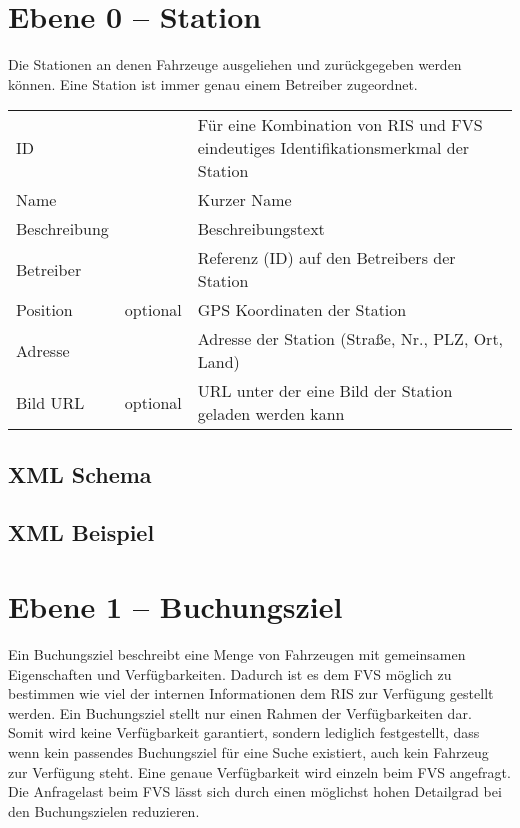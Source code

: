 \section{Ebene 0 -- Station}
Die Stationen an denen Fahrzeuge ausgeliehen und zurückgegeben werden können. Eine Station ist immer genau einem Betreiber zugeordnet.

\begin{flushleft}
\begin{tabularx}{\linewidth}{l>{\raggedright\arraybackslash}l>{\raggedright\arraybackslash}X} 
\toprule
ID & & Für eine Kombination von RIS und FVS eindeutiges Identifikationsmerkmal der Station \\
Name & & Kurzer Name \\
Beschreibung & & Beschreibungstext \\
Betreiber & & Referenz (ID) auf den Betreibers der Station \\
Position & optional & GPS Koordinaten der Station \\
Adresse & & Adresse der Station (Straße, Nr., PLZ, Ort, Land) \\
Bild URL & optional & URL unter der eine Bild der Station geladen werden kann \\
\bottomrule
\end{tabularx}
\end{flushleft}

\subsection{XML Schema}


\subsection{XML Beispiel}

\section{Ebene 1 -- Buchungsziel}
Ein Buchungsziel beschreibt eine Menge von Fahrzeugen mit gemeinsamen Eigenschaften und Verfügbarkeiten. Dadurch ist es dem FVS möglich zu bestimmen wie viel der internen Informationen dem RIS zur Verfügung gestellt werden. Ein Buchungsziel stellt nur einen Rahmen der Verfügbarkeiten dar. Somit wird keine Verfügbarkeit garantiert, sondern lediglich festgestellt, dass wenn kein passendes Buchungsziel für eine Suche existiert, auch kein Fahrzeug zur Verfügung steht. Eine genaue Verfügbarkeit wird einzeln beim FVS angefragt. Die Anfragelast beim FVS lässt sich durch einen möglichst hohen Detailgrad bei den Buchungszielen reduzieren.

